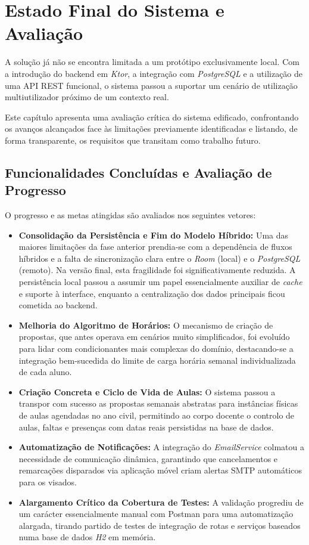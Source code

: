 %
%
\chapter{Estado Final do Sistema e Avaliação} \label{cap:estado-final}

A solução já não se encontra limitada a um protótipo exclusivamente local. Com a introdução do backend em \textit{Ktor}, a integração com \textit{PostgreSQL} e a utilização de uma API REST funcional, o sistema passou a suportar um cenário de utilização multiutilizador próximo de um contexto real.

Este capítulo apresenta uma avaliação crítica do sistema edificado, confrontando os avanços alcançados face às limitações previamente identificadas e listando, de forma transparente, os requisitos que transitam como trabalho futuro.

\section{Funcionalidades Concluídas e Avaliação de Progresso}

O progresso e as metas atingidas são avaliados nos seguintes vetores:

\begin{itemize}
    \item \textbf{Consolidação da Persistência e Fim do Modelo Híbrido:} Uma das maiores limitações da fase anterior prendia-se com a dependência de fluxos híbridos e a falta de sincronização clara entre o \textit{Room} (local) e o \textit{PostgreSQL} (remoto). Na versão final, esta fragilidade foi significativamente reduzida. A persistência local passou a assumir um papel essencialmente auxiliar de \textit{cache} e suporte à interface, enquanto a centralização dos dados principais ficou cometida ao backend.
    \item \textbf{Melhoria do Algoritmo de Horários:} O mecanismo de criação  de propostas, que antes operava em cenários muito simplificados, foi evoluído para lidar com condicionantes mais complexas do domínio, destacando-se a integração bem-sucedida do limite de carga horária semanal individualizada de cada aluno.
    \item \textbf{Criação Concreta e Ciclo de Vida de Aulas:} O sistema passou a transpor com sucesso as propostas semanais abstratas para instâncias físicas de aulas agendadas no ano civil, permitindo ao corpo docente o controlo de aulas, faltas e presenças com datas reais persistidas na base de dados.
    \item \textbf{Automatização de Notificações:} A integração do \textit{EmailService} colmatou a necessidade de comunicação dinâmica, garantindo que cancelamentos e remarcações disparados via aplicação móvel criam alertas SMTP automáticos para os visados.
    \item \textbf{Alargamento Crítico da Cobertura de Testes:} A validação progrediu de um carácter essencialmente manual com Postman para uma automatização alargada, tirando partido de testes de integração de rotas e serviços baseados numa base de dados \textit{H2} em memória.
\end{itemize}


